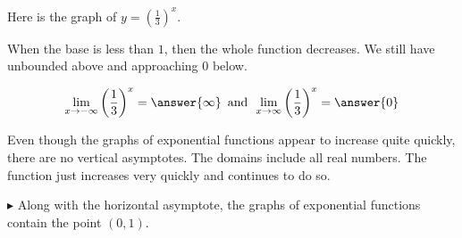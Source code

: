 \documentclass{ximera}
\begin{document}
Here is the graph of $y = \left(\frac{1}{3}\right)^x$.

\begin{image}
\end{image}


When the base is less than $1$, then the whole function decreases.  We still have unbounded above and approaching $0$ below.

\[  \lim_{x \to -\infty} \left(\frac{1}{3}\right)^x = \answer{\infty}     \, \text{ and } \,  \lim_{x \to \infty} \left(\frac{1}{3}\right)^x = \answer{0}   \]




Even though the graphs of exponential functions appear to increase quite quickly, there are no vertical asymptotes.  The domains include all real numbers.  The function just increases very quickly and continues to do so.



$\blacktriangleright$ Along with the horizontal asymptote, the graphs of exponential functions contain the point $(0, 1)$.
\end{document}
